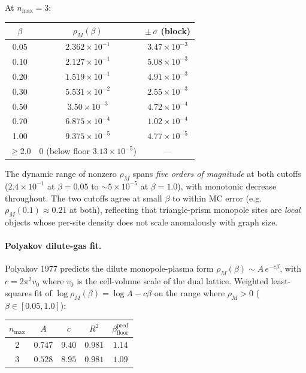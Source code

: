 \documentclass[11pt]{article}
\begin{document}
At $n_\text{max}=3$:

\begin{center}
\begin{tabular}{ccc}
\toprule
$\beta$ & $\rho_M(\beta)$ & $\pm\,\sigma$ (block) \\
\midrule
0.05 & $2.362\times 10^{-1}$ & $3.47\times 10^{-3}$ \\
0.10 & $2.127\times 10^{-1}$ & $5.08\times 10^{-3}$ \\
0.20 & $1.519\times 10^{-1}$ & $4.91\times 10^{-3}$ \\
0.30 & $5.531\times 10^{-2}$ & $2.55\times 10^{-3}$ \\
0.50 & $3.50\times 10^{-3}$  & $4.72\times 10^{-4}$ \\
0.70 & $6.875\times 10^{-4}$ & $1.02\times 10^{-4}$ \\
1.00 & $9.375\times 10^{-5}$ & $4.77\times 10^{-5}$ \\
$\ge 2.0$ & $0$ (below floor $3.13\times 10^{-5}$) & --- \\
\bottomrule
\end{tabular}
\end{center}

The dynamic range of nonzero $\rho_M$ spans \emph{five orders of magnitude}
at both cutoffs ($2.4\times 10^{-1}$ at $\beta=0.05$ to
$\sim 5\times 10^{-5}$ at $\beta=1.0$), with monotonic decrease throughout.
The two cutoffs agree at small $\beta$ to within MC error (e.g.\
$\rho_M(0.1)\approx 0.21$ at both), reflecting that triangle-prism monopole
sites are \emph{local} objects whose per-site density does not scale anomalously
with graph size.

\paragraph{Polyakov dilute-gas fit.} Polyakov 1977 predicts the dilute
monopole-plasma form $\rho_M(\beta)\sim A\,e^{-c\beta}$, with
$c=2\pi^2 v_0$ where $v_0$ is the cell-volume scale of the dual lattice.
Weighted least-squares fit of $\log\rho_M(\beta)=\log A-c\beta$ on the range
where $\rho_M>0$ ($\beta\in[0.05,1.0]$):

\begin{center}
\begin{tabular}{ccccc}
\toprule
$n_\text{max}$ & $A$ & $c$ & $R^2$ & $\beta_\text{floor}^\text{pred}$ \\
\midrule
2 & $0.747$ & $9.40$ & $0.981$ & $1.14$ \\
3 & $0.528$ & $8.95$ & $0.981$ & $1.09$ \\
\bottomrule
\end{tabular}
\end{center}
\end{document}
